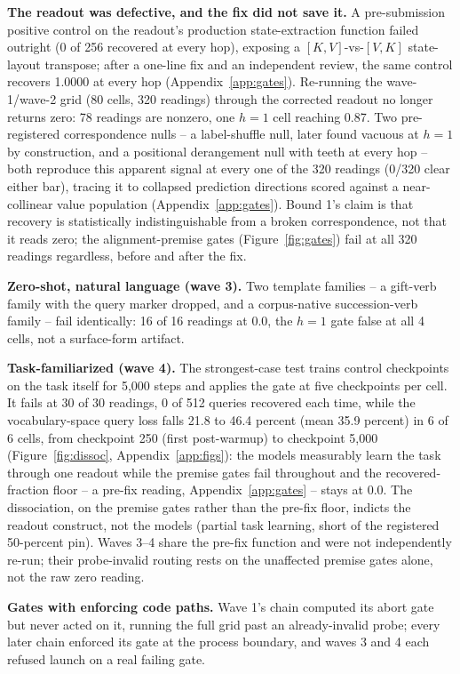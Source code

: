 \textbf{The readout was defective, and the fix did not save it.} A
pre-submission positive control on the readout's production
state-extraction function failed outright (0 of 256 recovered at every
hop), exposing a $[K,V]$-vs-$[V,K]$ state-layout transpose; after a
one-line fix and an independent review, the same control recovers 1.0000
at every hop (Appendix~\ref{app:gates}). %
Re-running the wave-1/wave-2 grid (80 cells, 320 readings) through the
corrected readout no longer returns zero: 78 readings are nonzero, one
$h{=}1$ cell reaching 0.87. %
Two pre-registered correspondence nulls -- a label-shuffle null, later
found vacuous at $h{=}1$ by construction, and a positional derangement
null with teeth at every hop -- both reproduce this apparent signal at
every one of the 320 readings (0/320 clear either bar), tracing it to
collapsed prediction directions scored against a near-collinear value
population (Appendix~\ref{app:gates}). %
Bound 1's claim is that recovery is statistically indistinguishable from a
broken correspondence, not that it reads zero; the alignment-premise gates
(Figure~\ref{fig:gates}) fail at all 320 readings regardless, before and
after the fix. %

\textbf{Zero-shot, natural language (wave 3).} Two template families -- a
gift-verb family with the query marker dropped, and a corpus-native
succession-verb family -- fail identically: 16 of 16 readings at 0.0, the
$h{=}1$ gate false at all 4 cells, not a surface-form artifact.

\textbf{Task-familiarized (wave 4).} The strongest-case test trains
control checkpoints on the task itself for 5{,}000 steps and applies the
gate at five checkpoints per cell. It fails at 30 of 30 readings, 0 of 512
queries recovered each time, %
while the vocabulary-space query loss falls 21.8 to 46.4 percent (mean
35.9 percent) in 6 of 6 cells, from checkpoint 250 (first post-warmup) to
checkpoint 5{,}000 %
(Figure~\ref{fig:dissoc}, Appendix~\ref{app:figs}): the models measurably
learn the task through one readout while the premise gates fail
throughout and the recovered-fraction floor -- a pre-fix reading,
Appendix~\ref{app:gates} -- stays at 0.0. The dissociation, on the
premise gates rather than the pre-fix floor, indicts the readout
construct, not the models (partial task learning, short of the registered
50-percent pin). Waves 3--4 share the pre-fix function and were not
independently re-run; their probe-invalid routing rests on the unaffected
premise gates alone, not the raw zero reading.

\textbf{Gates with enforcing code paths.} Wave 1's chain computed its
abort gate but never acted on it, running the full grid past an
already-invalid probe; every later chain enforced its gate at the process
boundary, and waves 3 and 4 each refused launch on a real failing gate.
